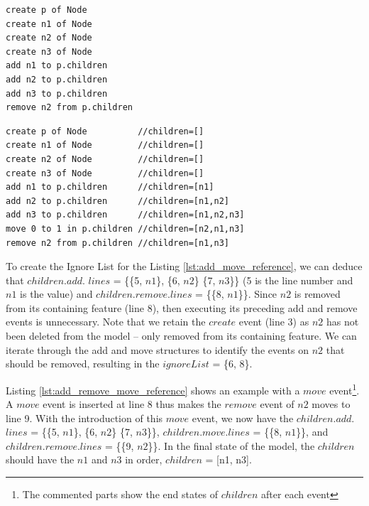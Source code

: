 {\vspace{-20pt}
\begin{minipage}[t]{0.34\linewidth}
\begin{lstlisting}[style=eol,caption={A CBP of add and remove operations.},label=lst:add_move_reference]
create p of Node
create n1 of Node
create n2 of Node
create n3 of Node
add n1 to p.children
add n2 to p.children
add n3 to p.children
remove n2 from p.children   
\end{lstlisting}
\end{minipage}
\hfill
\begin{minipage}[t]{0.62\linewidth}
\begin{lstlisting}[style=eol,caption={A CBP representation of add, move, and remove operations.},label=lst:add_remove_move_reference]
create p of Node          //children=[]
create n1 of Node         //children=[]
create n2 of Node         //children=[]
create n3 of Node         //children=[]
add n1 to p.children      //children=[n1]
add n2 to p.children      //children=[n1,n2]
add n3 to p.children      //children=[n1,n2,n3]
move 0 to 1 in p.children //children=[n2,n1,n3]
remove n2 from p.children //children=[n1,n3]
\end{lstlisting}
\end{minipage}

To create the Ignore List for the Listing \ref{lst:add_move_reference}, we can deduce that $children$.$add$. $lines$ = \{\{5, $n1$\}, \{6, $n2$\} \{7, $n3$\}\} (5 is the line number and $n1$ is the value) and $children$.$remove$.$lines$ = \{\{8, $n1$\}\}. Since $n2$ is removed from its containing feature (line 8), then executing its preceding add and remove events is unnecessary. Note that we retain the $create$ event (line 3) as $n2$ has not been deleted from the model -- only removed from its containing feature. We can iterate through the add and move structures to identify the events on $n2$ that should be removed, resulting in the $ignoreList$ = \{6, 8\}.

Listing \ref{lst:add_remove_move_reference} shows an example with a $move$ event\footnote{The commented parts  show the end states of $children$ after each event}. A $move$ event is inserted at line 8 thus makes the $remove$ event of $n2$  moves to line 9. With the introduction of this $move$ event, we now have the $children$.$add$.$lines$ = \{\{5, $n1$\}, \{6, $n2$\} \{7, $n3$\}\}, $children$.$move$.$lines$ = \{\{8, $n1$\}\}, and $children$.$remove$.$lines$ = \{\{9, $n2$\}\}. In the final state of the model, the $children$ should have the $n1$ and $n3$ in order, $children$ = [n1, n3].  

}
